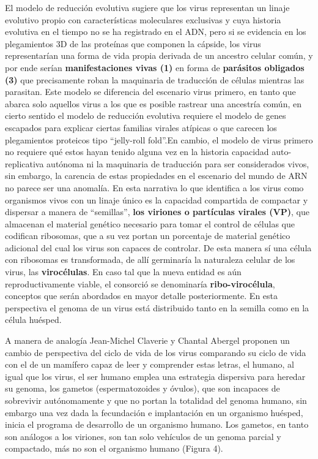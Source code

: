 \documentclass[
  12pt, krantz2,
  spanish,
]{krantz}
\begin{document}
El modelo de reducción evolutiva sugiere que los virus representan un linaje evolutivo propio con características moleculares exclusivas y cuya historia evolutiva en el tiempo no se ha registrado en el ADN, pero si se evidencia en los plegamientos 3D de las proteínas que componen la cápside, los virus representarían una forma de vida propia derivada de un ancestro celular común, y por ende serían \textbf{manifestaciones vivas (1)} en forma de \textbf{parásitos obligados (3)} que precisamente roban la maquinaria de traducción de células mientras las parasitan. Este modelo se diferencia del escenario virus primero, en tanto que abarca solo aquellos virus a los que es posible rastrear una ancestría común, en cierto sentido el modelo de reducción evolutiva requiere el modelo de genes escapados para explicar ciertas familias virales atípicas o que carecen los plegamientos proteicos tipo ``jelly-roll fold''.En cambio, el modelo de virus primero no requiere qué estos hayan tenido alguna vez en la historia capacidad auto-replicativa autónoma ni la maquinaria de traducción para ser considerados vivos, sin embargo, la carencia de estas propiedades en el escenario del mundo de ARN no parece ser una anomalía. En esta narrativa lo que identifica a los virus como organismos vivos con un linaje único es la capacidad compartida de compactar y dispersar a manera de ``semillas'', \textbf{los viriones o partículas virales (VP)}, que almacenan el material genético necesario para tomar el control de células que codifican ribosomas, que a su vez portan un porcentaje de material genético adicional del cual los virus son capaces de controlar. De esta manera sí una célula con ribosomas es transformada, de allí germinaría la naturaleza celular de los virus, las \textbf{virocélulas}. En caso tal que la nueva entidad es aún reproductivamente viable, el consorció se denominaría \textbf{ribo-virocélula}, conceptos que serán abordados en mayor detalle posteriormente. En esta perspectiva el genoma de un virus está distribuido tanto en la semilla como en la célula huésped.

A manera de analogía Jean-Michel Claverie y Chantal Abergel proponen un cambio de perspectiva del ciclo de vida de los virus comparando su ciclo de vida con el de un mamífero capaz de leer y comprender estas letras, el humano, al igual que los virus, el ser humano emplea una estrategia dispersiva para heredar su genoma, los gametos (espermatozoides y óvulos), que son incapaces de sobrevivir autónomamente y que no portan la totalidad del genoma humano, sin embargo una vez dada la fecundación e implantación en un organismo huésped, inicia el programa de desarrollo de un organismo humano. Los gametos, en tanto son análogos a los viriones, son tan solo vehículos de un genoma parcial y compactado, más no son el organismo humano (Figura 4).
\end{document}
